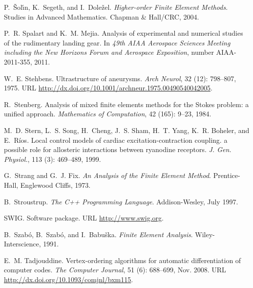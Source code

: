 \begin{thebibliography}{467}
P.~{\v{S}}ol{\'{\i}}n, K.~Segeth, and I.~Dole{\v{z}}el.
\newblock \emph{Higher-order Finite Element Methods}.
\newblock Studies in Advanced Mathematics. Chapman \& Hall/CRC, 2004.

P.~R. Spalart and K.~M. Mejia.
\newblock Analysis of experimental and numerical studies of the rudimentary
  landing gear.
\newblock In \emph{49th AIAA Aerospace Sciences Meeting including the New
  Horizons Forum and Aerospace Exposition}, number AIAA-2011-355, 2011.

W.~E. Stehbens.
\newblock Ultrastructure of aneurysms.
\newblock \emph{Arch Neurol}, 32 (12): 798--807, 1975.
\newblock URL \url{http://dx.doi.org/10.1001/archneur.1975.00490540042005}.

R.~Stenberg.
\newblock Analysis of mixed finite elements methods for the {S}tokes problem: a
  unified approach.
\newblock \emph{Mathematics of Computation}, 42 (165): 9--23,
  1984.

M.~D. Stern, L.~S. Song, H.~Cheng, J.~S. Sham, H.~T. Yang, K.~R. Boheler, and
  E.~R\'{i}os.
\newblock Local control models of cardiac excitation-contraction coupling. a
  possible role for allosteric interactions between ryanodine receptors.
\newblock \emph{J. Gen. Physiol.}, 113 (3): 469--489, 1999.

G.~Strang and G.~J. Fix.
\newblock \emph{An Analysis of the Finite Element Method}.
\newblock Prentice-Hall, Englewood Cliffs, 1973.

B.~Stroustrup.
\newblock \emph{The {C++} Programming Language}.
\newblock Addison-Wesley, July 1997.

SWIG.
\newblock Software package.
\newblock URL \url{http://www.swig.org}.

B.~Szab{\'o}, B.~Szab{\'o}, and I.~Babu\v{s}ka.
\newblock \emph{Finite Element Analysis}.
\newblock Wiley-Interscience, 1991.

E.~M. Tadjouddine.
\newblock Vertex-ordering algorithms for automatic differentiation of computer
  codes.
\newblock \emph{The Computer Journal}, 51 (6): 688--699, Nov.
  2008.
\newblock URL \url{http://dx.doi.org/10.1093/comjnl/bxm115}.


\end{thebibliography}
